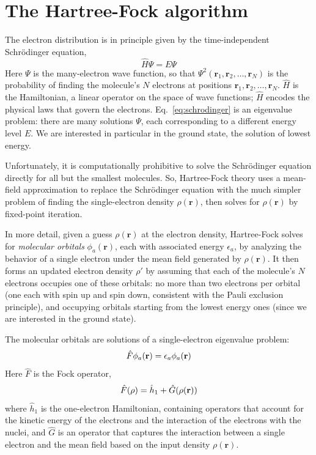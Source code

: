 \documentclass[twoside,11pt]{article}
\begin{document}


\clearpage
\appendix
\section{The Hartree-Fock algorithm}
\label{app:hf}


The electron distribution is in principle given by the time-independent Schr\"{o}dinger equation, 
\begin{equation} \label{eq:schrodinger}
				\hat{H}\Psi = E\Psi
\end{equation}
Here $\Psi$ is the many-electron wave function, so that $\Psi^2(\mathbf r_1, \mathbf r_2, \ldots, \mathbf r_N)$ is the probability of finding the molecule's $N$ electrons at positions $\mathbf r_1, \mathbf r_2, \ldots, \mathbf r_N$. $\hat{H}$ is the Hamiltonian, a linear operator on the space of wave functions; $\hat H$ encodes the physical laws that govern the electrons.  Eq.~\ref{eq:schrodinger} is an eigenvalue problem: there are many solutions $\Psi$, each corresponding to a different energy level $E$. We are interested in particular in the ground state, the solution of lowest energy.

Unfortunately, it is computationally prohibitive to solve the Schr\"odinger equation directly for all but the smallest molecules. So, Hartree-Fock theory uses a mean-field approximation to replace the Schr\"odinger equation with the much simpler problem of finding the single-electron density $\rho(\mathbf r)$, then solves for $\rho(\mathbf r)$ by fixed-point iteration.  

In more detail, given a guess $\rho(\mathbf r)$ at the electron density, Hartree-Fock solves for \emph{molecular orbitals} $\phi_a(\mathbf r)$, each with associated energy $\epsilon_a$, by analyzing the behavior of a single electron under the mean field generated by $\rho(\mathbf r)$. It then forms an updated electron density $\rho'$ by assuming that each of the molecule's $N$ electrons occupies one of these orbitals: no more than two electrons per orbital (one each with spin up and spin down, consistent with the Pauli exclusion principle), and occupying orbitals starting from the lowest energy ones (since we are interested in the ground state).

The molecular orbitals are solutions of a single-electron eigenvalue problem:
\begin{equation} \label{eq:fockSchrodinger}
				\hat{F}\phi_a({\bf r}) = \epsilon_a \phi_a({\bf r})
\end{equation}
Here $\hat F$ is the Fock operator, 
\begin{equation} \label{eq:fock}
\hat{F}(\rho) = \hat{h}_1 + \hat{G}(\rho({\bf r}))
\end{equation}
where $\hat{h}_1$ is the one-electron Hamiltonian, containing operators that account for the kinetic energy of the electrons and the interaction of the electrons with the nuclei, and $\hat{G}$ is an operator that captures the interaction between a single electron and the mean field based on the input density $\rho(\mathbf r)$.
\end{document}
